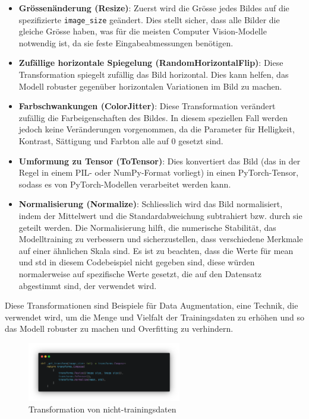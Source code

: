 \documentclass{article}
\begin{document}
\begin{itemize}

\item \textbf{Grössenänderung (Resize)}: Zuerst wird die Grösse jedes Bildes auf die spezifizierte \texttt{image\_size} geändert. Dies stellt sicher, dass alle Bilder die gleiche Grösse haben, was für die meisten Computer Vision-Modelle notwendig ist, da sie feste Eingabeabmessungen benötigen.

\item \textbf{Zufällige horizontale Spiegelung (RandomHorizontalFlip)}: Diese Transformation spiegelt zufällig das Bild horizontal. Dies kann helfen, das Modell robuster gegenüber horizontalen Variationen im Bild zu machen.

\item \textbf{Farbschwankungen (ColorJitter)}: Diese Transformation verändert zufällig die Farbeigenschaften des Bildes. In diesem speziellen Fall werden jedoch keine Veränderungen vorgenommen, da die Parameter für Helligkeit, Kontrast, Sättigung und Farbton alle auf 0 gesetzt sind.

\item \textbf{Umformung zu Tensor (ToTensor)}: Dies konvertiert das Bild (das in der Regel in einem PIL- oder NumPy-Format vorliegt) in einen PyTorch-Tensor, sodass es von PyTorch-Modellen verarbeitet werden kann.

\item \textbf{Normalisierung (Normalize)}: Schliesslich wird das Bild normalisiert, indem der Mittelwert und die Standardabweichung subtrahiert bzw. durch sie geteilt werden. Die Normalisierung hilft, die numerische Stabilität, das Modelltraining zu verbessern und sicherzustellen, dass verschiedene Merkmale auf einer ähnlichen Skala sind. Es ist zu beachten, dass die Werte für mean und std in diesem Codebeispiel nicht gegeben sind, diese würden normalerweise auf spezifische Werte gesetzt, die auf den Datensatz abgestimmt sind, der verwendet wird.

\end{itemize}

\noindent
Diese Transformationen sind Beispiele für Data Augmentation, eine Technik, die verwendet wird, um die Menge und Vielfalt der Trainingsdaten zu erhöhen und so das Modell robuster zu machen und Overfitting zu verhindern.

\newpage

\begin{figure}[!h]
    \centering
    \includegraphics[width=0.6\textwidth]{images/transformation.png}
    \caption{\label{fig:transformation}Transformation von nicht-trainingsdaten}
\end{figure}
\end{document}
